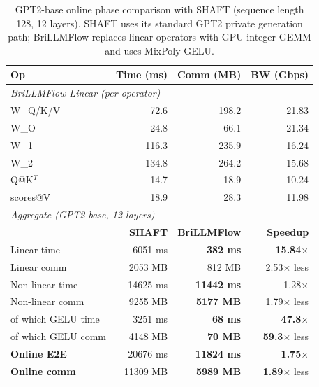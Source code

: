 \begin{table}[t]
\centering
\caption{GPT2-base online phase comparison with SHAFT (sequence length 128, 12 layers). SHAFT uses its standard GPT2 private generation path; BriLLMFlow replaces linear operators with GPU integer GEMM and uses MixPoly GELU.}
\label{tab:gpt2_shaft_comparison}
\setlength{\tabcolsep}{4pt}
\footnotesize
\begin{tabular}{lrrr}
\toprule
\textbf{Op} & \textbf{Time (ms)} & \textbf{Comm (MB)} & \textbf{BW (Gbps)} \\
\midrule
\multicolumn{4}{l}{\textit{BriLLMFlow Linear (per-operator)}} \\
W\_Q/K/V    & 72.6 & 198.2 & 21.83 \\
W\_O        & 24.8 & 66.1 & 21.34 \\
W\_1        & 116.3 & 235.9 & 16.24 \\
W\_2        & 134.8 & 264.2 & 15.68 \\
Q@K$^T$     & 14.7 & 18.9 & 10.24 \\
scores@V    & 18.9 & 28.3 & 11.98 \\
\midrule
\multicolumn{4}{l}{\textit{Aggregate (GPT2-base, 12 layers)}} \\
                       & \textbf{SHAFT} & \textbf{BriLLMFlow} & \textbf{Speedup} \\
Linear time            & 6051 ms & \textbf{382 ms} & \textbf{15.84}$\times$ \\
Linear comm            & 2053 MB & 812 MB & 2.53$\times$ less \\
Non-linear time        & 14625 ms & \textbf{11442 ms} & 1.28$\times$ \\
Non-linear comm        & 9255 MB & \textbf{5177 MB} & 1.79$\times$ less \\
\quad of which GELU time & 3251 ms & \textbf{68 ms} & \textbf{47.8}$\times$ \\
\quad of which GELU comm & 4148 MB & \textbf{70 MB} & \textbf{59.3}$\times$ less \\
\midrule
\textbf{Online E2E}    & 20676 ms & \textbf{11824 ms} & \textbf{1.75}$\times$ \\
\textbf{Online comm}   & 11309 MB & \textbf{5989 MB} & \textbf{1.89}$\times$ less \\
\bottomrule
\end{tabular}
\end{table}
